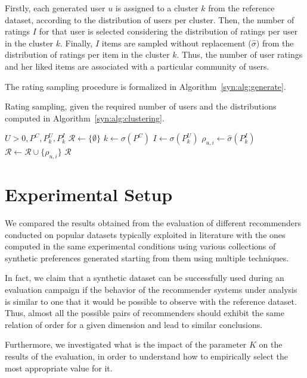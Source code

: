 Firstly, each generated user $u$ is assigned to a cluster $k$ from the reference dataset, according to the distribution of users per cluster. Then, the number of ratings $I$ for that user is selected considering the distribution of ratings per user in the cluster $k$. Finally, $I$ items are sampled without replacement ($\hat{\sigma}$) from the distribution of ratings per item in the cluster $k$. Thus, the number of user ratings and her liked items are associated with a particular community of users.

The rating sampling procedure is formalized in Algorithm~\ref{syn:alg:generate}.

\begin{algorithm}[ht]
\caption{Rating sampling, given the required number of users and the distributions computed in Algorithm~\ref{syn:alg:clustering}.}
\label{syn:alg:generate}
\begin{algorithmic}[1]
\REQUIRE $U > 0, P^C, P^U_k, P^I_k$
\STATE $\mathcal{R} \gets \{\emptyset\}$
\STATE $k \gets \sigma(P^C)$
\STATE $I \gets \sigma(P^U_k)$
\STATE $\rho_{u, i} \gets \hat{\sigma}(P^I_k)$
\STATE $\mathcal{R} \gets \mathcal{R} \cup \{\rho_{u, i}\}$
\ENDFOR
\ENDFOR
\RETURN $\mathcal{R}$
\end{algorithmic}
\end{algorithm}

\section{Experimental Setup}
\label{syn:sec:experiments}

We compared the results obtained from the evaluation of different recommenders conducted on popular datasets typically exploited in literature with the ones computed in the same experimental conditions using various collections of synthetic preferences generated starting from them using multiple techniques.

In fact, we claim that a synthetic dataset can be successfully used during an evaluation campaign if the behavior of the recommender systems under analysis is similar to one that it would be possible to observe with the reference dataset. Thus, almost all the possible pairs of recommenders should exhibit the same relation of order for a given dimension and lead to similar conclusions.

Furthermore, we investigated what is the impact of the parameter $K$ on the results of the evaluation, in order to understand how to empirically select the most appropriate value for it.

